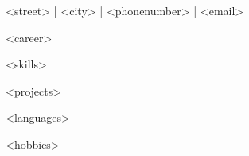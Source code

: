 \documentclass[12pt]{article}
\begin{document}

	\begin{center}
	{
	\small\bodyfont
	\faEnvelopeO\/ <street> | \faMapMarker\/ <city> | \faPhone\/ <phonenumber> |\faAt\protect\/ <email>
	}
	\end{center}


	\setlength{\parskip}{\baselineskip}
	\setlength{\parindent}{2pt}

<career>

<skills>

<projects>

<languages>

<hobbies>
\end{document}

